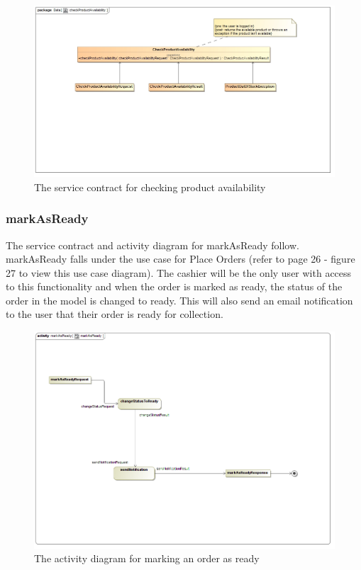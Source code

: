\documentclass[a4paper,12pt]{report}
\begin{document}
\begin{figure}[H]
	\centering
	\includegraphics[width=1.0\textwidth]{../images/checkProductAvailabilitySC.jpg}
	\caption{The service contract for checking product availability}
\end{figure}

\subsubsection{markAsReady}
The service contract and activity diagram for markAsReady follow. markAsReady falls under the use case for Place Orders (refer to page 26 - figure 27 to view this use case diagram). The cashier will be the only user with access to this functionality and when the order is marked as ready, the status of the order in the model is changed to ready. This will also send an email notification to the user that their order is ready for collection. 
\begin{figure}[H]
  \centering
    \includegraphics[width=1.0\textwidth]{../images/markAsReadyActivity.png}
    \caption{The activity diagram for marking an order as ready } 
\end{figure}
 
\end{document}
